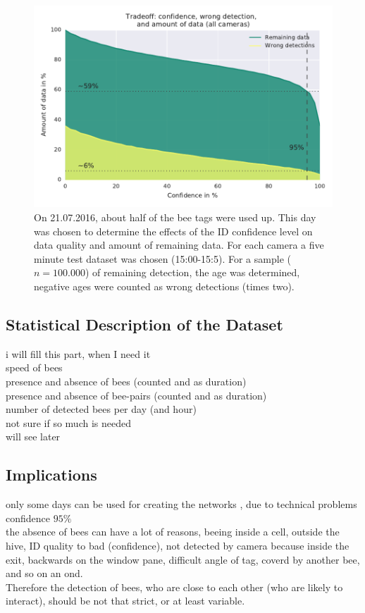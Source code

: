 \begin{figure}[htb]
	\centering
	\includegraphics[width=1.0\textwidth]{Figures/tradeoff}
	\caption[Tradeoff: Confidence level, data quality and amount of data]{On 21.07.2016, about half of the bee tags were used up. This day was chosen to determine the effects of the ID confidence level on data quality and amount of remaining data. For each camera a five minute test dataset was chosen (15:00-15:5). For a sample ($n= 100.000$) of remaining detection, the age was determined, negative ages were counted as wrong detections (times two).}
	\label{fig:tradeoff}
\end{figure}


\subsection{Statistical Description of the Dataset}
i will fill this part, when I need it\\
speed of bees\\
presence and absence of bees (counted and as duration)\\
presence and absence of bee-pairs (counted and as duration)\\
number of detected bees per day (and hour)\\ 
not sure if so much is needed\\
will see later\\


\subsection{Implications}
only some days can be used for creating the networks , due to technical problems\\
confidence $95\%$\\
the absence of bees can have a lot of reasons, beeing inside a cell, outside the hive, ID quality to bad (confidence), not detected by camera because inside the exit, backwards on the window pane, difficult angle of tag, coverd by another bee, and so on an ond.\\
Therefore the detection of bees, who are close to each other (who are likely to interact), should be not that strict, or at least variable.\\


